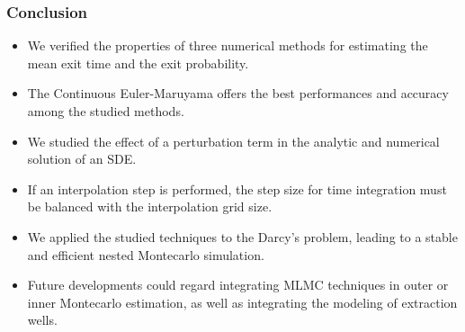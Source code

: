 \begin{frame}
\frametitle{Conclusion}
\begin{itemize}
	\item We verified the properties of three numerical methods for estimating the mean exit time and the exit probability.
	\item The Continuous Euler-Maruyama offers the best performances and accuracy among the studied methods.
	\item We studied the effect of a perturbation term in the analytic and numerical solution of an SDE.
	\item If an interpolation step is performed, the step size for time integration must be balanced with the interpolation grid size.
	\item We applied the studied techniques to the Darcy's problem, leading to a stable and efficient nested Montecarlo simulation.
	\item Future developments could regard integrating MLMC techniques in outer or inner Montecarlo estimation, as well as integrating the modeling of extraction wells.
\end{itemize}

\end{frame}

